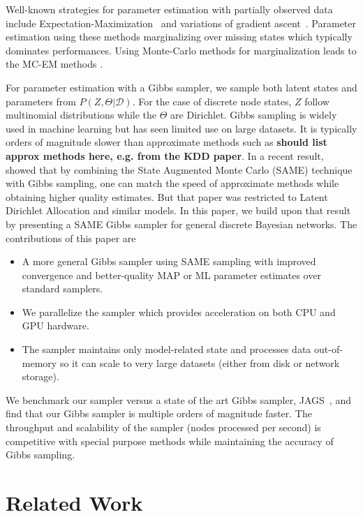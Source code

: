 \documentclass{article} %
\begin{document}
Well-known strategies for parameter estimation with partially observed
data include Expectation-Maximization~\citep{EMpaper} and variations
of gradient ascent~\citep{Thiesson95}.  Parameter estimation using
these methods marginalizing over missing states which typically
dominates performances. Using Monte-Carlo methods for marginalization
leads to the MC-EM methods \cite{MC-EM}.

For parameter estimation with a Gibbs sampler, we sample both latent
states and parameters from $P(Z,\Theta|\mathcal{D})$.  For the case of
discrete node states, $Z$ follow multinomial distributions while the
$\Theta$ are Dirichlet. Gibbs sampling is widely used in machine
learning but has seen limited use on large datasets.  It is typically
orders of magnitude slower than approximate methods such as {\bf
  should list approx methods here, e.g.  from the KDD paper}. In a
recent result,~\citet{SAME2015} showed that by combining the State
Augmented Monte Carlo (SAME) technique~\citep{SAME2002} with Gibbs
sampling, one can match the speed of approximate methods while
obtaining higher quality estimates. But that paper was restricted to
Latent Dirichlet Allocation and similar models.  In this paper, we
build upon that result by presenting a SAME Gibbs sampler for general
discrete Bayesian networks. The contributions of this paper are

\begin{itemize}[noitemsep]
    \item A more general Gibbs sampler using SAME sampling with improved convergence and better-quality MAP or ML parameter
      estimates over standard samplers.
    \item We parallelize the sampler which provides acceleration on both CPU and GPU
      hardware.
    \item The sampler maintains only model-related state and processes data out-of-memory
      so it can scale to very large datasets (either from disk or network storage).
\end{itemize}

We benchmark our sampler versus a state of the art Gibbs sampler,
JAGS~\citep{JAGS2003}, and find that our Gibbs sampler is multiple
orders of magnitude faster. The throughput and scalability of the
sampler (nodes processed per second) is competitive with special
purpose methods while maintaining the accuracy of Gibbs sampling.


\section{Related Work}\label{sec:related_work}
\end{document}
